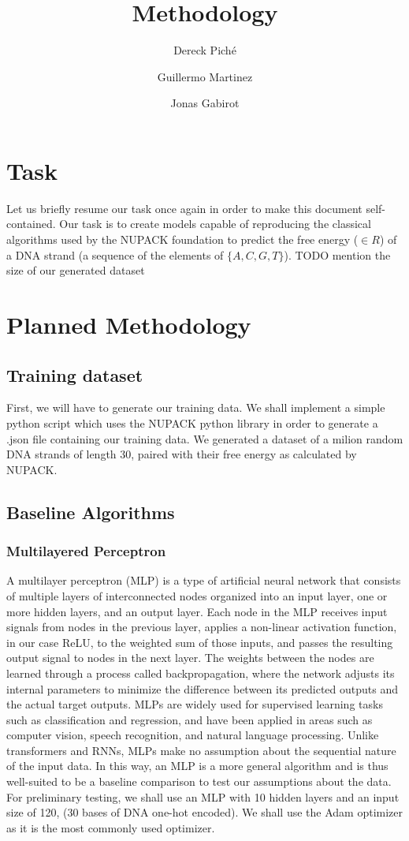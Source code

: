 \documentclass{article}
\title{Methodology}
\author
{
    Dereck Piché \and
    Guillermo Martinez \and
    Jonas Gabirot \and
}
\begin{document}
\maketitle

\section{Task}
Let us briefly resume our task once again in order to make this document
self-contained. Our task is to create models capable of reproducing 
the classical algorithms used by the NUPACK foundation to predict the 
free energy ($\in R$) of a DNA strand (a sequence of the elements of $\{A,C,G,T\}$).
TODO mention the size of our generated dataset

\section{Planned Methodology}
\subsection{Training dataset}
First, we will have to generate our training data. We shall implement a 
simple python script which uses the NUPACK python library in order
to generate a .json file containing our training data. We  
generated a dataset of a milion random DNA strands of length $30$, paired with their free energy as calculated by NUPACK.
\subsection{Baseline Algorithms}

\subsubsection{Multilayered Perceptron}
A multilayer perceptron (MLP) is a type of artificial neural network that consists of multiple layers of interconnected nodes organized into an input layer, one or more hidden layers, and an output layer. Each node in the MLP receives input signals from nodes in the previous layer, applies a non-linear activation function, in our case ReLU, to the weighted sum of those inputs, and passes the resulting output signal to nodes in the next layer. The weights between the nodes are learned through a process called backpropagation, where the network adjusts its internal parameters to minimize the difference between its predicted outputs and the actual target outputs. MLPs are widely used for supervised learning tasks such as classification and regression, and have been applied in areas such as computer vision, speech recognition, and natural language processing. Unlike transformers and RNNs, MLPs make no assumption about the sequential nature of the input data. In this way, an MLP is a more general algorithm and is thus well-suited to be a baseline comparison to test our assumptions about the data. For preliminary testing, we shall use an MLP with 10 hidden layers and an input size of 120, (30 bases of DNA one-hot encoded). We shall use the Adam optimizer as it is the most commonly used optimizer.
\end{document}
